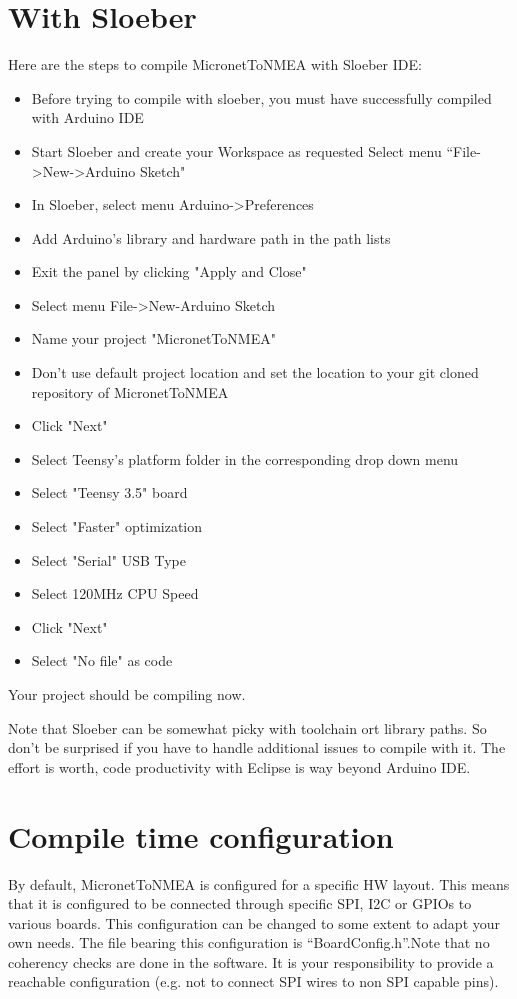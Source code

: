 \documentclass{report}
\begin{document}
\section{With Sloeber}

Here are the steps to compile MicronetToNMEA with Sloeber IDE:

\begin{itemize}
\item Before trying to compile with sloeber, you must have successfully compiled with Arduino IDE
\item Start Sloeber and create your Workspace as requested Select menu “File->New->Arduino Sketch"
\item In Sloeber, select menu Arduino->Preferences
\item Add Arduino's library and hardware path in the path lists
\item Exit the panel by clicking "Apply and Close"
\item Select menu File->New-Arduino Sketch
\item Name your project "MicronetToNMEA"
\item Don't use default project location and set the location to your git cloned repository of MicronetToNMEA
\item Click "Next"
\item Select Teensy's platform folder
in the corresponding drop down menu
\item Select "Teensy 3.5" board
\item Select "Faster"
 optimization
\item Select "Serial" USB Type
\item Select 120MHz CPU Speed
\item Click "Next"
\item Select "No file" as code
\end{itemize}

Your project should be compiling now.

Note that Sloeber can be somewhat picky with toolchain ort library paths. So don’t be surprised if you have to handle additional issues to compile with it. The effort is worth, code productivity with Eclipse is way beyond Arduino IDE.

\section{Compile time configuration}

By default, MicronetToNMEA is configured for a specific HW layout. This means that it is configured to be connected through specific SPI, I2C or GPIOs to various boards. This configuration can be changed to some extent to adapt your own needs. The file bearing this configuration is “BoardConfig.h”.Note that no coherency checks are done in the software. It is your responsibility to provide a reachable configuration (e.g. not to connect SPI wires to non SPI capable pins).
\end{document}
